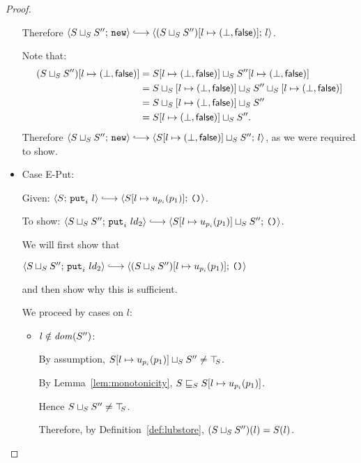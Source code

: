\begin{proof}
\begin{itemize}
      Therefore $\config{\lubstore{S}{S''}}{\NEW} \parstepsto
      \config{\extS{(\lubstore{S}{S''})}{l}{\bot}{\frozenfalse}}{l}$.

      Note that:
      \begin{align*}
        (S \sqcup_{S} S'')[l \mapsto (\bot, \textsf{false})] &=
        S[l \mapsto (\bot, \textsf{false})] \sqcup_{S} S''[l \mapsto (\bot, \textsf{false})] \\
        &= S \sqcup_{S} \left[ l \mapsto (\bot, \textsf{false}) \right] \sqcup_{S} S'' \sqcup_{S} \left[ l \mapsto (\bot, \textsf{false}) \right] \\
        &= S \sqcup_{S} \left[ l \mapsto (\bot, \textsf{false}) \right] \sqcup_{S} S'' \\
        &= S[l \mapsto (\bot, \textsf{false})] \sqcup_{S} S''.
      \end{align*}
      Therefore $\config{\lubstore{S}{S''}}{\NEW} \parstepsto
      \config{\lubstore{\extS{S}{l}{\bot}{\frozenfalse}}{S''}}{l}$, as we were
      required to show.

    \item Case {\sc E-Put}:

      Given: $\config{S}{\putiexp{l}} \parstepsto
      \config{\extSRaw{S}{l}{u_{p_i}(p_1)}}{\unit}$.

      To show: $\config{\lubstore{S}{S''}}{\putiexp{l}{d_2}}
      \parstepsto
      \config{\lubstore{\extSRaw{S}{l}{u_{p_i}(p_1)}}{S''}}{\unit}$.

      We will first show that

      $\config{\lubstore{S}{S''}}{\putiexp{l}{d_2}} \parstepsto
      \config{\extSRaw{(\lubstore{S}{S''})}{l}{u_{p_i}(p_1)}}{\unit}$

      and then show why this is sufficient.

      We proceed by cases on $l$:

      \begin{itemize}
        \item $l \notin \mathit{dom}(S'')$:

          By assumption, $S[l \mapsto u_{p_i}(p_1)] \sqcup_{S} S''
          \neq \top\hspace{-0.85mm}_{S}$.

          By Lemma~\ref{lem:monotonicity},
          $S \sqsubseteq_S S[l \mapsto u_{p_i}(p_1)]$.

          Hence $S \sqcup_{S} S'' \neq \top\hspace{-0.85mm}_{S}$.

          Therefore, by Definition~\ref{def:lubstore},
          $(S \sqcup_{S} S'')(l) = S(l)$.


\end{itemize}
\end{itemize}
\end{proof}
